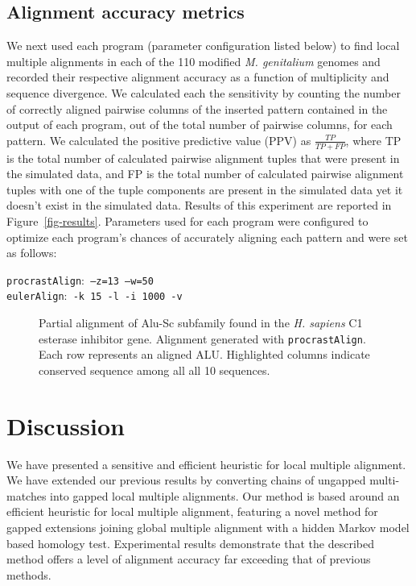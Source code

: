 \documentclass{ws-procs975x65}
\begin{document}
\subsection{Alignment accuracy metrics}
We next used each program (parameter configuration listed below) to find local multiple alignments in each of the 110 modified \emph{M. genitalium} genomes and recorded their respective alignment accuracy as a function of multiplicity and sequence divergence. We calculated each the sensitivity by counting the number of correctly aligned pairwise columns of the inserted pattern contained in the output of each program, out of the total number of pairwise columns, for each pattern. We calculated the positive predictive value (PPV) as
$\frac{TP}{TP + FP}$, where TP is the total number of calculated pairwise alignment tuples that were present in
the simulated data, and FP is the total number of calculated pairwise alignment tuples with
one of the tuple components are present in the simulated data yet it doesn't exist in the simulated data.  Results of this experiment are reported in Figure~\ref{fig-results}. Parameters used for each program were configured to optimize each program's chances of accurately aligning each pattern and were set as follows:  \begin{center}\texttt{procrastAlign}:\texttt{ --z=13 --w=50 } \\ \texttt{eulerAlign}:\texttt{ -k 15 -l -i 1000 -v}\end{center}


\begin{figure}[t]
\centering {}
\caption{Partial alignment of Alu-Sc subfamily found in the \emph{H. sapiens} C1 esterase inhibitor gene.  Alignment generated with \texttt{procrastAlign}. Each row represents an aligned ALU. Highlighted columns indicate conserved sequence among all all 10 sequences.}
\label{fig-align}
\end{figure}

\section{Discussion}

We have presented a sensitive and efficient heuristic for local multiple alignment. We have extended our previous results by converting chains of ungapped multi-matches into gapped local multiple alignments. Our method is based around an efficient heuristic for local multiple alignment, featuring a novel method for gapped extensions joining global multiple alignment with a hidden Markov model based homology test.  Experimental results demonstrate that the described method offers a level of alignment accuracy far exceeding that of previous methods.
\end{document}
